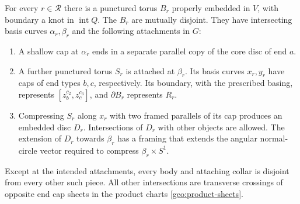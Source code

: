 \begin{lemma}\label{geo:stages}
For every $r\in\mathcal R$ there is a punctured torus $B_r$ properly
embedded in $V$, with boundary a knot in $\operatorname{int}Q$.
The $B_r$ are mutually disjoint.  They have intersecting basis curves
$\alpha_r,\beta_r$ and the following attachments in $G$:
\begin{enumerate}
\item A shallow cap at $\alpha_r$ ends in a separate parallel copy of
the core disc of end $a$.
\item A further punctured torus $S_r$ is attached at $\beta_r$.
Its basis curves $x_r,y_r$ have caps of end types $b,c$, respectively.
Its boundary, with the prescribed basing, represents
$[z_b^{c_2},z_c^{c_3}]$, and $\partial B_r$ represents $R_r$.
\item Compressing $S_r$ along $x_r$ with two framed parallels of its
cap produces an embedded disc $D_r$.  Intersections of $D_r$ with
other objects are allowed.  The extension of $D_r$ towards $\beta_r$
has a framing that extends the angular normal-circle vector required
to compress $\beta_r\times S^1$.
\end{enumerate}
Except at the intended attachments, every body and attaching collar
is disjoint from every other such piece.  All other intersections
are transverse crossings of opposite end cap sheets in the product
charts \eqref{geo:product-sheets}.
\end{lemma}

